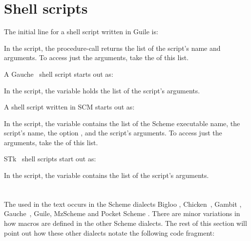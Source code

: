 \iffalse
Note, however, that for the purposes of this text, you
don't need to insert code into \p{~/.mzschemerc},
since we don't use any nonstandard Scheme feature not
already defined in MzScheme.
\fi


\section{Shell scripts}

The initial line for a shell script written in Guile is:


In the script, the procedure-call  returns
the list of the script's name and arguments.  To access
just the arguments, take the  of this list.

A Gauche~\cite{gauche} shell script starts out as:


In the script, the variable  holds 
the list of the script's arguments.

A shell script written in SCM starts out as:


In the script, the variable  contains
the list of the Scheme executable name, the script's
name, the option , and the script's arguments.
To
access just the arguments, take the  of this list.

STk~\cite{stk} shell scripts start out as:


In the script, the variable  contains
the list of the script's arguments.


\section{}
\label{dialect-macro}

The  used in the text occurs in
the Scheme dialects Bigloo \cite{bigloo},
Chicken~\cite{chicken}, Gambit
\cite{gambit}, Gauche~\cite{gauche}, Guile, MzScheme and Pocket Scheme
\cite{pocketscheme}.  There are minor variations in
how macros are defined in the other Scheme dialects.
The rest of this section will point out how these
other dialects notate the following code fragment:

